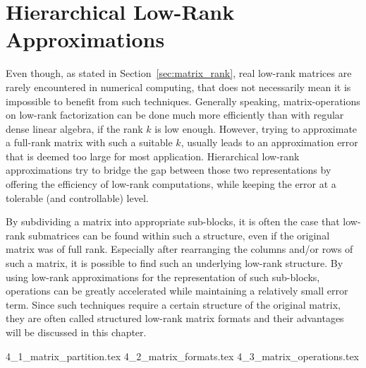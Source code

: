 \chapter{Hierarchical Low-Rank Approximations}
\label{chap:hierarchical_matrices}

Even though, as stated in Section~\hyperref[sec:matrix_rank]{\ref{sec:matrix_rank}}, real low-rank matrices are rarely encountered in numerical computing, that does not necessarily mean it is impossible to benefit from such techniques. Generally speaking, matrix-operations on low-rank factorization can be done much more efficiently than with regular dense linear algebra, if the rank $k$ is low enough. However, trying to approximate a full-rank matrix with such a suitable $k$, usually leads to an approximation error that is deemed too large for most application. Hierarchical low-rank approximations try to bridge the gap between those two representations by offering the efficiency of low-rank computations, while keeping the error at a tolerable (and controllable) level.

By subdividing a matrix into appropriate sub-blocks, it is often the case that low-rank submatrices can be found within such a structure, even if the original matrix was of full rank. Especially after rearranging the columns and/or rows of such a matrix, it is possible to find such an underlying low-rank structure. By using low-rank approximations for the representation of such sub-blocks, operations can be greatly accelerated while maintaining a relatively small error term. Since such techniques require a certain structure of the original matrix, they are often called structured low-rank matrix formats and their advantages will be discussed in this chapter.


{4_1_matrix_partition.tex}
{4_2_matrix_formats.tex}
{4_3_matrix_operations.tex}